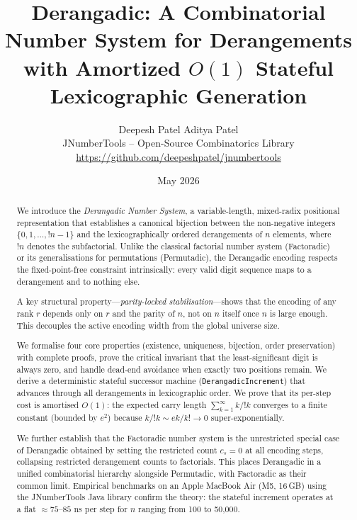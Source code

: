 \documentclass[11pt,a4paper]{article}
\title{%
    \textbf{Derangadic: A Combinatorial Number System for Derangements}\\[4pt]
    \large with Amortized $O(1)$ Stateful Lexicographic Generation
}
\author{%
    Deepesh Patel \quad Aditya Patel\\[2pt]
    \small JNumberTools -- Open-Source Combinatorics Library\\
    \small\href{https://github.com/deepeshpatel/jnumbertools}{https://github.com/deepeshpatel/jnumbertools}
}
\date{May 2026}
\newcommand{\subfact}[1]{!{#1}} %
\begin{document}
    \maketitle

    \begin{abstract}

        We introduce the \emph{Derangadic Number System}, a variable-length,
        mixed-radix positional representation that establishes a canonical bijection
        between the non-negative integers $\{0,1,\dots,\subfact{n}-1\}$ and the
        lexicographically ordered derangements of $n$ elements, where $\subfact{n}$
        denotes the subfactorial. Unlike the classical factorial number system
        (Factoradic) or its generalisations for permutations (Permutadic), the
        Derangadic encoding respects the fixed-point-free constraint intrinsically:
        every valid digit sequence maps to a derangement and to nothing else.

        A key structural property---\emph{parity-locked stabilisation}---shows that
        the encoding of any rank $r$ depends only on $r$ and the parity of $n$, not
        on $n$ itself once $n$ is large enough. This decouples the active encoding
        width from the global universe size.

        We formalise four core properties (existence, uniqueness, bijection, order
        preservation) with complete proofs, prove the critical invariant that the
        least-significant digit is always zero, and handle dead-end avoidance when
        exactly two positions remain. We derive a deterministic stateful successor
        machine (\texttt{DerangadicIncrement}) that advances through all derangements
        in lexicographic order. We prove that its per-step cost is amortised $O(1)$:
        the expected carry length $\sum_{k=1}^{\infty} k/\subfact{k}$ converges to a
        finite constant (bounded by $e^2$) because $k/\subfact{k} \sim ek/k! \to 0$
        super-exponentially.

        We further establish that the Factoradic number system is the unrestricted
        special case of Derangadic obtained by setting the restricted count
        $c_s=0$ at all encoding steps, collapsing restricted derangement counts to
        factorials. This places Derangadic in a unified combinatorial hierarchy
        alongside Permutadic, with Factoradic as their common limit. Empirical
        benchmarks on an Apple MacBook Air (M5, 16\,GB) using the JNumberTools Java
        library confirm the theory: the stateful increment operates at a flat
        $\approx 75$--$85$ ns per step for $n$ ranging from 100 to 50,000.

    \end{abstract}
\end{document}
